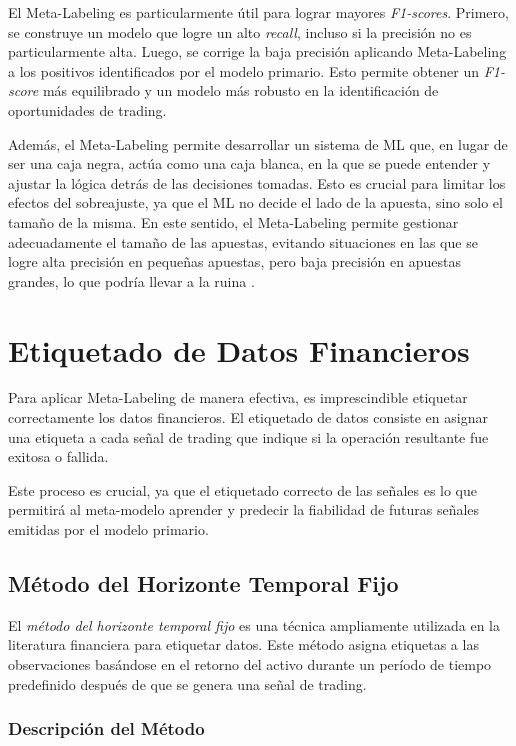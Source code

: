 \documentclass[a4paper,12pt, twoside]{report}
\begin{document}
El Meta-Labeling es particularmente útil para lograr mayores \textit{F1-scores}. 
Primero, se construye un modelo que logre un alto \textit{recall}, incluso si la 
precisión no es particularmente alta. Luego, se corrige la baja precisión aplicando 
Meta-Labeling a los positivos identificados por el modelo primario. Esto permite 
obtener un \textit{F1-score} más equilibrado y un modelo más robusto en la 
identificación de oportunidades de trading.

Además, el Meta-Labeling permite desarrollar un sistema de ML que, en lugar de 
ser una caja negra, actúa como una caja blanca, en la que se puede entender y 
ajustar la lógica detrás de las decisiones tomadas. Esto es crucial para limitar 
los efectos del sobreajuste, ya que el ML no decide el lado de la apuesta, sino 
solo el tamaño de la misma. En este sentido, el Meta-Labeling permite gestionar 
adecuadamente el tamaño de las apuestas, evitando situaciones en las que se 
logre alta precisión en pequeñas apuestas, pero baja precisión en apuestas 
grandes, lo que podría llevar a la ruina \cite{lopezdeprado2018afml}.


\section{Etiquetado de Datos Financieros}

Para aplicar Meta-Labeling de manera efectiva, es imprescindible etiquetar correctamente 
los datos financieros. El etiquetado de datos consiste en asignar una etiqueta a cada 
señal de trading que indique si la operación resultante fue exitosa o fallida. 

Este proceso es crucial, ya que el etiquetado correcto de las señales es lo que 
permitirá al meta-modelo aprender y predecir la fiabilidad de futuras señales 
emitidas por el modelo primario.

\subsection{Método del Horizonte Temporal Fijo}

El \textit{método del horizonte temporal fijo} es una técnica ampliamente utilizada en la literatura financiera para etiquetar datos. Este método asigna etiquetas a las observaciones basándose en el retorno del activo durante un período de tiempo predefinido después de que se genera una señal de trading.

\subsubsection{Descripción del Método}
\end{document}
